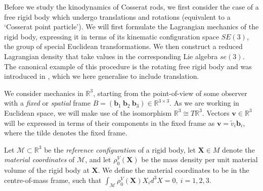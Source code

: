 Before we study the kinodynamics of Cosserat rods, we first consider the case of a free rigid body which undergo translations and rotations (equivalent to a `Cosserat point particle'). We will first formulate the Lagrangian mechanics of the rigid body, expressing it in terms of its kinematic configuration space $SE(3)$, the group of special Euclidean transformations. We then construct a reduced Lagrangian density that take values in the corresponding Lie algebra $\textit{se}(3)$. The canonical example of this procedure is the rotating free rigid body and was introduced in \citep{marsdenIntroductionMechanicsSymmetry2013, holmEulerPoincareEquations1998, cendraLagrangianReductionEuler1999}, which we here generalise to include translation.

We consider mechanics in $\mathbb{R}^3$, starting from the point-of-view of some observer with a \textit{fixed} or \textit{spatial} frame $B = (\mathbf{b}_1\ \mathbf{b}_2\ \mathbf{b}_3) \in \mathbb{R}^{3 \times 3}$. As we are working in Euclidean space, we will make use of the isomorphism $\mathbb{R}^3 \cong T\mathbb{R}^3$. Vectors $\mathbf{v} \in \mathbb{R}^3$ will be expressed in terms of their components in the fixed frame as $\mathbf{v} = \tilde{v}_i \mathbf{b}_i$, where the tilde denotes the fixed frame.

Let $\mathscr{M} \subset \mathbb{R}^3$ be the \textit{reference configuration} of a rigid body, let $\mathbf{X} \in M$ denote the \textit{material coordinates} of $\mathscr{M}$, and let $\rho^V_0(\mathbf{X})$ be the mass density per unit material volume of the rigid body at $\mathbf{X}$. We define the material coordinates to be in the centre-of-mass frame, such that $\int_\mathscr{M} \rho^V_0(\mathbf{X}) X_i d^3 X = 0,\ i=1,2,3$.
 
